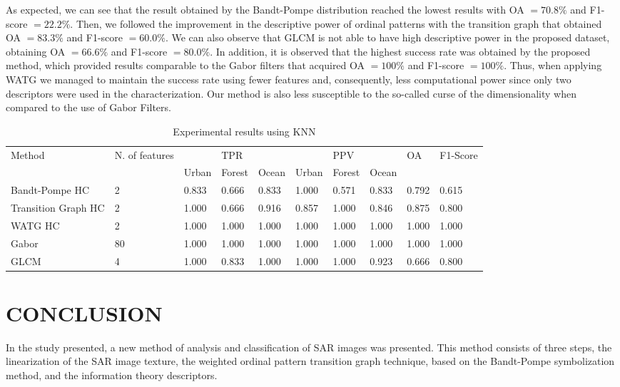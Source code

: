 \documentclass[journal]{IEEEtran}
\begin{document}
As expected, we can see that the result obtained by the Bandt-Pompe distribution reached the lowest results with OA $= 70.8\%$ and F1-score $= 22.2\%$.
Then, we followed the improvement in the descriptive power of ordinal patterns with the transition graph that obtained OA $= 83.3\%$ and F1-score $= 60.0\%$.
We can also observe that GLCM is not able to have high descriptive power in the proposed dataset, obtaining OA $= 66.6\%$ and F1-score $= 80.0\%$.
In addition, it is observed that the highest success rate was obtained by the proposed method, which provided results comparable to the Gabor filters that acquired OA $= 100\%$ and F1-score $= 100\%$.
Thus, when applying WATG we managed to maintain the success rate using fewer features and, consequently, less computational power since only two descriptors were used in the characterization. {\color{red}Our method is also less susceptible to the so-called curse of the dimensionality when compared to the use of Gabor Filters.}

\begin{table}[!h]
\centering
\caption{Experimental results using KNN}
\label{tab:result1}
\begin{tabular}{|l|l|lll|lll|l|l|}
\hline
Method      & N. of features         &       & TPR   &       &       & PPV    &       & OA  & F1-Score \\ \cline{3-8} 
                 &   & Urban & Forest & Ocean & Urban & Forest & Ocean & &  \\\hline
Bandt-Pompe HC   & 2 & 0.833 &  0.666  & 0.833 & 1.000 & 0.571  & 0.833 & 0.792 &  0.615  \\ 
Transition Graph HC & 2  & 1.000 & 0.666  & 0.916 & 0.857 & 1.000  & 0.846 & 0.875 & 0.800 \\
WATG HC         & 2  & 1.000 & 1.000  & 1.000 & 1.000 & 1.000  & 1.000 & 1.000 & 1.000 \\ 
Gabor           & 80  & 1.000 & 1.000  & 1.000 & 1.000 & 1.000  & 1.000 & 1.000 & 1.000\\
GLCM            & 4   & 1.000 & 0.833  & 1.000 & 1.000 & 1.000  & 0.923 & 0.666 & 0.800\\
\hline
\end{tabular}
\end{table}

\section{CONCLUSION}\label{Conclusion}

In the study presented, a new method of analysis and classification of SAR images was presented.
This method consists of three steps, the linearization of the SAR image texture, the weighted ordinal pattern transition graph technique, based on the Bandt-Pompe symbolization method, and the information theory descriptors.
\end{document}
